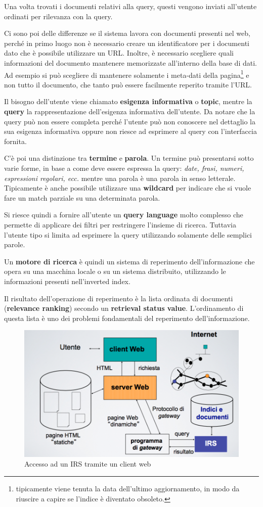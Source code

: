 Una volta trovati i documenti relativi alla query, questi vengono inviati all'utente ordinati per rilevanza con la query.

Ci sono poi delle differenze se il sistema lavora con documenti presenti nel web, perché in primo luogo non è necessario creare un identificatore per i documenti dato che è possibile utilizzare un URL.
Inoltre, è necessario scegliere quali informazioni del documento mantenere memorizzate all'interno della base di dati. Ad esempio si può scegliere di mantenere solamente i meta-dati della pagina\footnote{tipicamente viene tenuta la data dell'ultimo aggiornamento, in modo da riuscire a capire se l'indice è diventato obsoleto.} e non tutto il documento, che tanto può essere facilmente reperito tramite l'URL.

Il bisogno dell'utente viene chiamato \textbf{esigenza informativa} o \textbf{topic}, mentre la \textbf{query} la rappresentazione dell'esigenza informativa dell'utente.
Da notare che la query può non essere completa perché l'utente può non conoscere nel dettaglio la sua esigenza informativa oppure non riesce ad esprimere al query con l'interfaccia fornita.

C'è poi una distinzione tra \textbf{termine} e \textbf{parola}. Un termine può presentarsi sotto varie forme, in base a come deve essere espressa la query: \textit{date, frasi, numeri, espressioni regolari, ecc.} mentre una parola è una parola in senso letterale.
Tipicamente è anche possibile utilizzare una \textbf{wildcard} per indicare che si vuole fare un match parziale su una determinata parola.

Si riesce quindi a fornire all'utente un \textbf{query language} molto complesso che permette di applicare dei filtri per restringere l'insieme di ricerca. Tuttavia l'utente tipo si limita ad esprimere la query utilizzando solamente delle semplici parole.

Un \textbf{motore di ricerca} è quindi un sistema di reperimento dell'informazione che opera su una macchina locale o su un sistema distribuito, utilizzando le informazioni presenti nell'inverted index.

Il risultato dell'operazione di reperimento è la lista ordinata di documenti (\textbf{relevance ranking}) secondo un \textbf{retrieval status value}.
L'ordinamento di questa lista è uno dei problemi fondamentali del reperimento dell'informazione.

\begin{figure}[htbp]
	\centering
	\includegraphics[width=.6\textwidth]{images/l2-irsweb.png}
	\caption{Accesso ad un IRS tramite un client web}
\end{figure}

